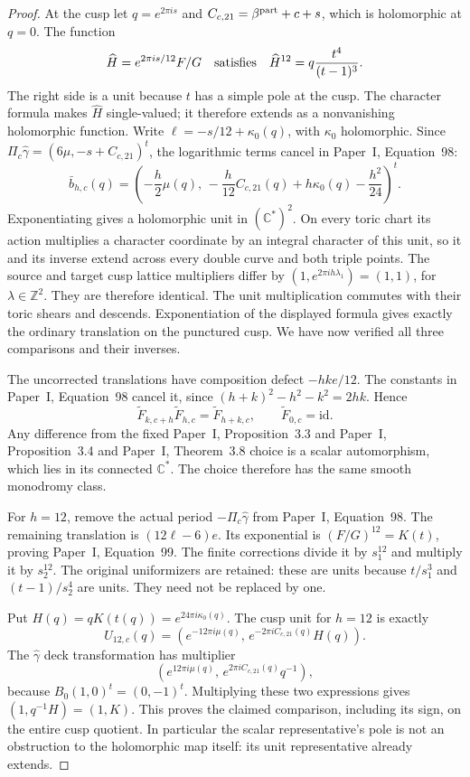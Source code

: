 \begin{proof}
At the cusp let \(q=e^{2\pi i s}\) and
\(C_{c,21}=\beta^{\rm part}+c+s\), which is holomorphic at
\(q=0\). The function
\[
 \widehat H=e^{2\pi i s/12}F/G
 \quad\hbox{satisfies}\quad
 \widehat H^{12}=q\frac{t^4}{(t-1)^3}.
\]
The right side is a unit because \(t\) has a simple pole at the
cusp. The character formula makes \(\widehat H\) single-valued;
it therefore extends as a nonvanishing holomorphic function. Write
\(\ell=-s/12+\kappa_0(q)\), with \(\kappa_0\) holomorphic.
Since
\(\Pi_c\widehat\gamma=(6\mu,-s+C_{c,21})^t\),
the logarithmic terms cancel in Paper~I, Equation~98:
\[
 \bar b_{h,c}(q)=
 \left(-\frac h2\mu(q),\,
 -\frac h{12}C_{c,21}(q)+h\kappa_0(q)-\frac{h^2}{24}\right)^t.
\]
Exponentiating gives a holomorphic unit in \((\mathbb C^*)^2\).
On every toric chart its action multiplies a character coordinate
by an integral character of this unit, so it and its inverse
extend across every double curve and both triple points. The
source and target cusp lattice multipliers differ by
\((1,e^{2\pi i h\lambda_1})=(1,1)\), for
\(\lambda\in\mathbb Z^2\). They are therefore identical. The
unit multiplication commutes with their toric shears and descends.
Exponentiation of the displayed formula gives exactly the ordinary
translation on the punctured cusp. We have now verified all
three comparisons and their inverses.

The uncorrected translations have composition defect
\(-hk e/12\). The constants in
Paper~I, Equation~98 cancel it, since
\((h+k)^2-h^2-k^2=2hk\). Hence
\[
 \widetilde F_{k,c+h}\widetilde F_{h,c}
       =\widetilde F_{h+k,c},\qquad
 \widetilde F_{0,c}=\mathrm{id}.
\]
Any difference from the fixed Paper~I, Proposition~3.3 and Paper~I, Proposition~3.4 and Paper~I, Theorem~3.8 choice is a scalar automorphism,
which lies in its connected \(\mathbb C^*\). The choice therefore
has the same smooth monodromy class.

For \(h=12\), remove the actual period
\(-\Pi_c\widehat\gamma\) from Paper~I, Equation~98.
The remaining translation is \((12\ell-6)e\). Its exponential
is \((F/G)^{12}=K(t)\), proving
Paper~I, Equation~99. The finite corrections divide it by
\(s_1^{12}\) and multiply it by \(s_2^{12}\). The original
uniformizers are retained: these are units because
\(t/s_1^3\) and \((t-1)/s_2^4\) are units. They need not be
replaced by one.

Put \(H(q)=qK(t(q))=e^{24\pi i\kappa_0(q)}\). The cusp unit
for \(h=12\) is exactly
\[
 U_{12,c}(q)=
 \left(e^{-12\pi i\mu(q)},\,
       e^{-2\pi i C_{c,21}(q)}H(q)\right).
\]
The \(\widehat\gamma\) deck transformation has multiplier
\[
 \left(e^{12\pi i\mu(q)},\,
       e^{2\pi i C_{c,21}(q)}q^{-1}\right),
\]
because \(B_0(1,0)^t=(0,-1)^t\). Multiplying these two
expressions gives \((1,q^{-1}H)=(1,K)\). This proves the
claimed comparison, including its sign, on the entire cusp
quotient. In particular the scalar representative's pole is not
an obstruction to the holomorphic map itself: its unit
representative already extends.


\end{proof}
